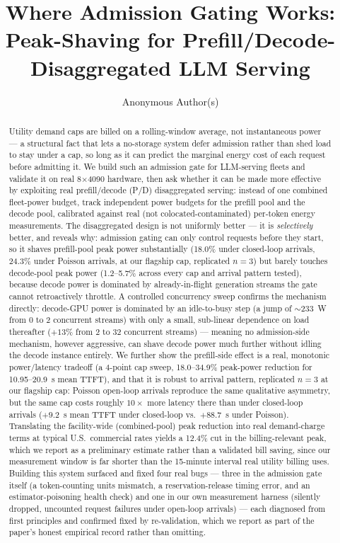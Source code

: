 \documentclass[sigconf,review,anonymous]{acmart}
\begin{document}
\title{Where Admission Gating Works: Peak-Shaving for Prefill/Decode-Disaggregated LLM Serving}

\author{Anonymous Author(s)}

\begin{abstract}
Utility demand caps are billed on a rolling-window average, not instantaneous power --- a
structural fact that lets a no-storage system defer admission rather than shed load to stay
under a cap, so long as it can predict the marginal energy cost of each request before
admitting it. We build such an admission gate for LLM-serving fleets and validate it on real
8$\times$4090 hardware, then ask whether it can be made more effective by exploiting real
prefill/decode (P/D) disaggregated serving: instead of one combined fleet-power budget, track
independent power budgets for the prefill pool and the decode pool, calibrated against real
(not colocated-contaminated) per-token energy measurements. The disaggregated design is not
uniformly better --- it is \emph{selectively} better, and reveals why: admission gating can
only control requests before they start, so it shaves prefill-pool peak power substantially
(18.0\% under closed-loop arrivals, 24.3\% under Poisson arrivals, at our flagship cap,
replicated $n{=}3$) but barely touches decode-pool peak power (1.2--5.7\% across every cap and
arrival pattern tested), because decode power is dominated by already-in-flight generation
streams the gate cannot retroactively throttle. A controlled concurrency sweep confirms the
mechanism directly: decode-GPU power is dominated by an idle-to-busy step (a jump of
${\sim}233$~W from 0 to 2 concurrent streams) with only a small, sub-linear dependence on load
thereafter ($+13\%$ from 2 to 32 concurrent streams) --- meaning no admission-side mechanism,
however aggressive, can shave decode power much further without idling the decode instance
entirely. We further show the prefill-side effect is a real, monotonic power/latency tradeoff
(a 4-point cap sweep, 18.0--34.9\% peak-power reduction for 10.95--20.9~s mean TTFT), and that
it is robust to arrival pattern, replicated $n{=}3$ at our flagship cap: Poisson open-loop
arrivals reproduce the same qualitative asymmetry, but the same cap costs roughly $10\times$
more latency there than under closed-loop arrivals ($+9.2$~s mean TTFT under closed-loop vs.\
$+88.7$~s under Poisson). Translating the facility-wide (combined-pool) peak reduction into
real demand-charge terms at typical U.S.\ commercial rates yields a 12.4\% cut in the
billing-relevant peak, which we report as a preliminary estimate rather than a validated bill
saving, since our measurement window is far shorter than the 15-minute interval real utility
billing uses. Building this system surfaced and fixed four real bugs --- three in
the admission gate itself (a token-counting units mismatch, a reservation-release timing
error, and an estimator-poisoning health check) and one in our own measurement harness
(silently dropped, uncounted request failures under open-loop arrivals) --- each diagnosed
from first principles and confirmed fixed by re-validation, which we report as part of the
paper's honest empirical record rather than omitting.
\end{abstract}
\end{document}
